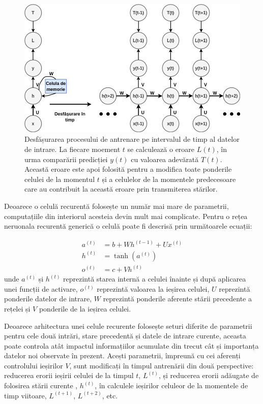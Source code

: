 \documentclass[a4paper,12pt]{book}
\begin{document}
				\begin{figure}[t]
					\centering
					\includegraphics[scale=0.6]{rnn_layer}
					\caption{Desfășurarea procesului de antrenare pe intervalul de timp al datelor de intrare. La fiecare moement $t$ se calculează o eroare $L(t)$, în urma comparării predicției $y(t)$ cu valoarea adevărată $T(t)$. Această eroare este apoi folosită pentru a modifica toate ponderile celulei de la momentul $t$ și a celulelor de la momentele predecesoare care au contribuit la această eroare prin transmiterea stărilor.
					}
					\label{fig:rnn_layer}
				\end{figure} 
					Deoarece o celulă recurentă folosește un număr mai mare de parametrii, computațiile din interiorul acesteia devin mult mai complicate. Pentru o rețea neruonala recurentă generică o celulă poate fi descrisă prin următoarele ecuații:
				
				\begin{align}
					a^{(t)} &= b + Wh^{(t-1)} + Ux^{(t)} \\ \label{rnn_states}
					h^{(t)} &= \tanh{(a^{(t)})}\\
					o^{(t)} &= c + Vh^{(t)}	
				\end{align}
				unde $a^{(t)}$ și $h^{(t)}$ reprezintă starea internă a celulei înainte și după aplicarea unei funcții de activare, $o^{(t)}$ reprezintă valoarea la ieșirea celulei, $U$ reprezintă ponderile datelor de intrare, $W$ reprezintă ponderile aferente stării precedente a rețelei și $V$ ponderile de la ieșirea celulei. \par
				
				Deoarece arhitectura unei celule recurente folosește seturi diferite de parametrii pentru cele două intrări, stare precedentă și datele de intrare curente, aceasta poate controla atât impactul informațiilor acumulate din trecut cât și importanța datelor noi observate în prezent. Acești parametrii, împreună cu cei aferenți controlului ieșirilor $V$,  sunt modificați în timpul antrenării din două perspective: reducerea erorii ieșirii celulei de la timpul $t$, $L^{(t)}$,  și reducerea erorii adăugate de folosirea stării curente , $h^{(t)}$, în calculele ieșirilor celuleor de la momentele de timp viitoare, $L^{(t+1)}$, $L^{(t+2)}$, etc. \par
				
\end{document}
